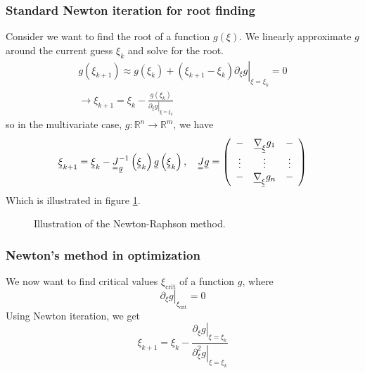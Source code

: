 \subsubsection{Standard Newton iteration for root finding}
Consider we want to find the root of a function $g(\xi)$. We linearly approximate
$g$ around the current guess $\xi_k$ and solve for the root.
\begin{equation}
    \begin{gathered}
    g\left(\xi_{k+1}\right) \approx g\left(\xi_k\right)+\left.\left(\xi_{k+1}-\xi_k\right) \partial_{\xi} g\right|_{\xi=\xi_k}=0 \\
    \rightarrow \xi_{k+1}=\xi_k-\frac{g\left(\xi_k\right)}{\left.\partial_{\xi} g\right|_{\xi=\xi_k}}
    \end{gathered}
\end{equation}
so in the multivariate case, $g: \mathbb{R}^n \rightarrow \mathbb{R}^m$, we have
\begin{equation}
    \vec{\xi}_{k+1}=\vec{\xi}_k-\mat{J}_{\vec{g}}^{-1}\left(\vec{\xi}_k\right) \vec{g}\left(\vec{\xi}_k\right), \quad \mat{J} \vec{g}=\left(\begin{array}{ccc}
    - & \vec{\nabla}_{\vec{\xi}} g_1 & - \\
    \vdots & \vdots & \vdots \\
    - & \vec{\nabla}_{\vec{\xi}} g_n & -
    \end{array}\right)
\end{equation}
Which is illustrated in figure \ref{fig:newton_raphson}.

\begin{figure}[!htb]
    \centering
    
    \caption{Illustration of the Newton-Raphson method.}
    \label{fig:newton_raphson}
\end{figure}

\subsubsection{Newton's method in optimization}
We now want to find critical values $\xi_{\text{crit}}$ of a function $g$, where
\begin{equation}
    \left. \partial_{\xi} g \right|_{\xi_{\text{crit}}} = 0
\end{equation}
Using Newton iteration, we get
\begin{equation}
    \xi_{k+1}=\xi_k-\frac{\left.\partial_{\xi} g\right|_{\xi=\xi_k}}{\left.\partial_{\xi}^2 g\right|_{\xi=\xi_k}}
\end{equation}

